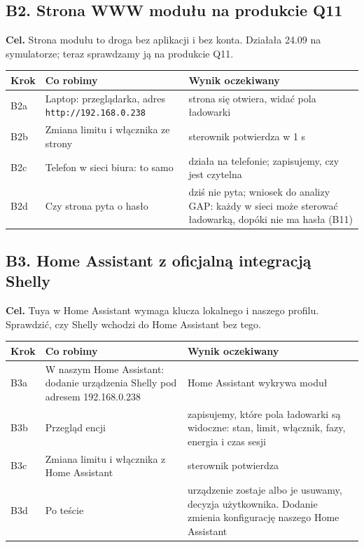 \documentclass[11pt,a4paper]{article}
\begin{document}
\subsection{B2. Strona WWW modułu na produkcie Q11}

\textbf{Cel.} Strona modułu to droga bez aplikacji i bez konta. Działała 24.09 na symulatorze; teraz sprawdzamy ją na produkcie Q11.


\begin{longtable}{>{\raggedright\arraybackslash}p{3.00cm}>{\raggedright\arraybackslash}p{4.73cm}>{\raggedright\arraybackslash}p{7.55cm}}
\toprule
\rowcolor{apteallight}\textbf{Krok} & \textbf{Co robimy} & \textbf{Wynik oczekiwany} \\
\midrule\endhead
\bottomrule\endfoot
B2a & Laptop: przeglądarka, adres \texttt{http:\allowbreak{}/\allowbreak{}/\allowbreak{}192.\allowbreak{}168.\allowbreak{}0.\allowbreak{}238} & strona się otwiera, widać pola ładowarki \\
B2b & Zmiana limitu i włącznika ze strony & sterownik potwierdza w 1 s \\
B2c & Telefon w sieci biura: to samo & działa na telefonie; zapisujemy, czy jest czytelna \\
B2d & Czy strona pyta o hasło & dziś nie pyta; wniosek do analizy GAP: każdy w sieci może sterować ładowarką, dopóki nie ma hasła (B11) \\
\end{longtable}

\subsection{B3. Home Assistant z oficjalną integracją Shelly}

\textbf{Cel.} Tuya w Home Assistant wymaga klucza lokalnego i naszego profilu. Sprawdzić, czy Shelly wchodzi do Home Assistant bez tego.


\begin{longtable}{>{\raggedright\arraybackslash}p{3.00cm}>{\raggedright\arraybackslash}p{4.42cm}>{\raggedright\arraybackslash}p{7.86cm}}
\toprule
\rowcolor{apteallight}\textbf{Krok} & \textbf{Co robimy} & \textbf{Wynik oczekiwany} \\
\midrule\endhead
\bottomrule\endfoot
B3a & W naszym Home Assistant: dodanie urządzenia Shelly pod adresem 192.168.0.238 & Home Assistant wykrywa moduł \\
B3b & Przegląd encji & zapisujemy, które pola ładowarki są widoczne: stan, limit, włącznik, fazy, energia i czas sesji \\
B3c & Zmiana limitu i włącznika z Home Assistant & sterownik potwierdza \\
B3d & Po teście & urządzenie zostaje albo je usuwamy, decyzja użytkownika. Dodanie zmienia konfigurację naszego Home Assistant \\
\end{longtable}
\end{document}
